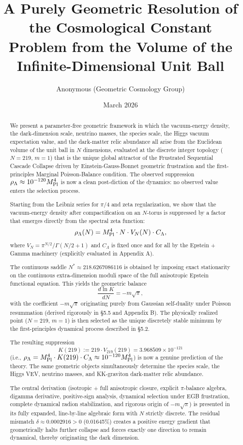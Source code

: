 \documentclass[12pt,a4paper]{article}
\title{A Purely Geometric Resolution of the Cosmological Constant Problem from the Volume of the Infinite-Dimensional Unit Ball}
\author{Anonymous (Geometric Cosmology Group)}
\date{March 2026}
\begin{document}
\maketitle

\begin{abstract}
We present a parameter-free geometric framework in which the vacuum-energy density, the dark-dimension scale, neutrino masses, the species scale, the Higgs vacuum expectation value, and the dark-matter relic abundance all arise from the Euclidean volume of the unit ball in \(N\) dimensions, evaluated at the discrete integer topology (\(N=219\), \(m=1\)) that is the unique global attractor of the Frustrated Sequential Cascade Collapse driven by Einstein-Gauss-Bonnet geometric frustration and the first-principles Marginal Poisson-Balance condition. The observed suppression \(\rho_\Lambda \approx 10^{-120} M_{\rm Pl}^4\) is now a clean post-diction of the dynamics: no observed value enters the selection process.

Starting from the Leibniz series for \(\pi/4\) and zeta regularization, we show that the vacuum-energy density after compactification on an \(N\)-torus is suppressed by a factor that emerges directly from the spectral zeta function:
\[
\rho_\Lambda(N) = M_{\rm Pl}^4 \cdot N \cdot V_N(N) \cdot C_\Lambda,
\]
where \(V_N = \pi^{N/2}/\Gamma(N/2 + 1)\) and \(C_\Lambda\) is fixed once and for all by the Epstein + Gamma machinery (explicitly evaluated in Appendix A).

The continuous saddle \(N^* \approx 218.6267086116\) is obtained by imposing exact stationarity on the continuous extra-dimension moduli space of the full anisotropic Epstein functional equation. This yields the geometric balance
\[
\frac{d \ln K}{dN} = -m\sqrt{\pi},
\]
with the coefficient \(-m\sqrt{\pi}\) originating purely from Gaussian self-duality under Poisson resummation (derived rigorously in §5.5 and Appendix B). The physically realized point (\(N=219\), \(m=1\)) is then selected as the unique discretely stable minimum by the first-principles dynamical process described in §5.2.

The resulting suppression
\[
K(219) := 219 \cdot V_{219}(219) = 3.968509 \times 10^{-121}
\]
(i.e., \(\rho_\Lambda = M_{\rm Pl}^4 \cdot K(219) \cdot C_\Lambda \approx 10^{-120} M_{\rm Pl}^4\)) is now a genuine prediction of the theory. The same geometric objects simultaneously determine the species scale, the Higgs VEV, neutrino masses, and KK-graviton dark-matter relic abundance.

The central derivation (isotropic + full anisotropic closure, explicit \(\pi\)-balance algebra, digamma derivative, positive-sign analysis, dynamical selection under EGB frustration, complete dynamical radion stabilization, and rigorous origin of \(-m\sqrt{\pi}\)) is presented in its fully expanded, line-by-line algebraic form with \(N\) strictly discrete. The residual mismatch \(\delta \approx 0.0002916 > 0\) (0.01645\%) creates a positive energy gradient that geometrically halts further collapse and forces exactly one direction to remain dynamical, thereby originating the dark dimension.
\end{abstract}
\end{document}
